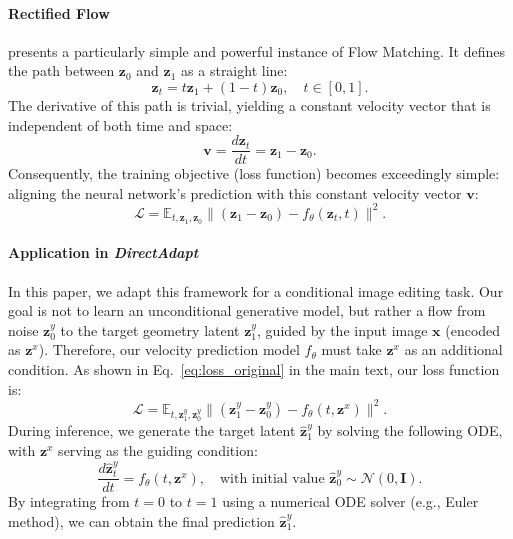 \documentclass{article} %
\begin{document}
\paragraph{Rectified Flow}
\citep{rectified_flow} presents a particularly simple and powerful instance of Flow Matching. It defines the path between $\mathbf{z}_0$ and $\mathbf{z}_1$ as a straight line:
$$
    \mathbf{z}_t = t \mathbf{z}_1 + (1-t) \mathbf{z}_0, \quad t \in [0, 1].
$$
The derivative of this path is trivial, yielding a constant velocity vector that is independent of both time and space:
$$
    \mathbf{v} = \frac{d\mathbf{z}_t}{dt} = \mathbf{z}_1 - \mathbf{z}_0.
$$
Consequently, the training objective (loss function) becomes exceedingly simple: aligning the neural network's prediction with this constant velocity vector $\mathbf{v}$:
$$
    \mathcal{L} = \mathbb{E}_{t, \mathbf{z}_1, \mathbf{z}_0} \| (\mathbf{z}_1 - \mathbf{z}_0) - f_\theta(\mathbf{z}_t, t) \|^2.
$$

\paragraph{Application in \textit{DirectAdapt}}
In this paper, we adapt this framework for a conditional image editing task. Our goal is not to learn an unconditional generative model, but rather a flow from noise $\mathbf{z}^y_0$ to the target geometry latent $\mathbf{z}^y_1$, guided by the input image $\mathbf{x}$ (encoded as $\mathbf{z}^x$). Therefore, our velocity prediction model $f_\theta$ must take $\mathbf{z}^x$ as an additional condition. As shown in Eq.~\ref{eq:loss_original} in the main text, our loss function is:
$$
    \mathcal{L} = \mathbb{E}_{t,\mathbf{z}^y_1, \mathbf{z}^y_0} \| (\mathbf{z}^y_1 - \mathbf{z}^y_0) - f_\theta(t, \mathbf{z}^x) \|^2.
$$
During inference, we generate the target latent $\hat{\mathbf{z}}^y_1$ by solving the following ODE, with $\mathbf{z}^x$ serving as the guiding condition:
$$
\frac{d\hat{\mathbf{z}}^y_t}{dt} = f_\theta(t, \mathbf{z}^x), \quad \text{with initial value } \hat{\mathbf{z}}^y_0 \sim \mathcal{N}(0, \mathbf{I}).
$$
By integrating from $t=0$ to $t=1$ using a numerical ODE solver (e.g., Euler method), we can obtain the final prediction $\hat{\mathbf{z}}^y_1$.
\end{document}

